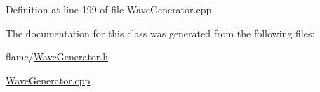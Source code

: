 Definition at line 199 of file Wave\-Generator.\-cpp.



The documentation for this class was generated from the following files\-:\begin{DoxyCompactItemize}
\item 
flame/\hyperlink{_wave_generator_8h}{Wave\-Generator.\-h}\item 
\hyperlink{_wave_generator_8cpp}{Wave\-Generator.\-cpp}\end{DoxyCompactItemize}
